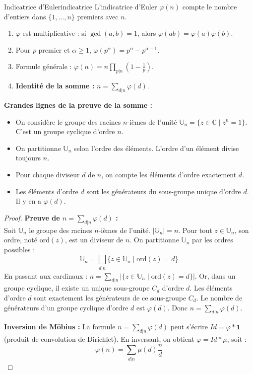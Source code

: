 \documentclass{prepacours}
\begin{document}
\begin{proposition}{Indicatrice d'Euler}{indicatrice}
    L'indicatrice d'Euler $\varphi(n)$ compte le nombre d'entiers dans $\{1, \dots, n\}$ premiers avec $n$.
    \begin{enumerate}
        \item $\varphi$ est multiplicative : si $\gcd(a,b)=1$, alors $\varphi(ab) = \varphi(a)\varphi(b)$.
        \item Pour $p$ premier et $\alpha \ge 1$, $\varphi(p^\alpha) = p^\alpha - p^{\alpha-1}$.
        \item Formule générale : $\varphi(n) = n \prod_{p|n} (1 - \frac{1}{p})$.
        \item \textbf{Identité de la somme :} $n = \sum_{d|n} \varphi(d)$.
    \end{enumerate}
\end{proposition}

\noindent \textbf{Grandes lignes de la preuve de la somme :}
\begin{itemize}
    \item On considère le groupe des racines $n$-ièmes de l'unité $\mathbb{U}_n = \{z \in \mathbb{C} \mid z^n = 1\}$. C'est un groupe cyclique d'ordre $n$.
    \item On partitionne $\mathbb{U}_n$ selon l'ordre des éléments. L'ordre d'un élément divise toujours $n$.
    \item Pour chaque diviseur $d$ de $n$, on compte les éléments d'ordre exactement $d$.
    \item Les éléments d'ordre $d$ sont les générateurs du sous-groupe unique d'ordre $d$. Il y en a $\varphi(d)$.
\end{itemize}

\begin{proof}
    \textbf{Preuve de $n = \sum_{d|n} \varphi(d)$ :} \\
    Soit $\mathbb{U}_n$ le groupe des racines $n$-ièmes de l'unité. $|\mathbb{U}_n| = n$.
    Pour tout $z \in \mathbb{U}_n$, son ordre, noté $\text{ord}(z)$, est un diviseur de $n$.
    On partitionne $\mathbb{U}_n$ par les ordres possibles :
    \[ \mathbb{U}_n = \bigsqcup_{d|n} \{z \in \mathbb{U}_n \mid \text{ord}(z) = d\} \]
    En passant aux cardinaux : $n = \sum_{d|n} |\{z \in \mathbb{U}_n \mid \text{ord}(z) = d\}|$.
    Or, dans un groupe cyclique, il existe un unique sous-groupe $C_d$ d'ordre $d$. Les éléments d'ordre $d$ sont exactement les générateurs de ce sous-groupe $C_d$.
    Le nombre de générateurs d'un groupe cyclique d'ordre $d$ est $\varphi(d)$.
    Donc $n = \sum_{d|n} \varphi(d)$.
    
    \vspace{0.5em}
    \textbf{Inversion de Möbius :}
    La formule $n = \sum_{d|n} \varphi(d)$ peut s'écrire $Id = \varphi * \mathbf{1}$ (produit de convolution de Dirichlet).
    En inversant, on obtient $\varphi = Id * \mu$, soit :
    \[ \varphi(n) = \sum_{d|n} \mu(d) \frac{n}{d} \]
\end{proof}
\end{document}
